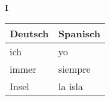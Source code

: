 \begin{flushright}\begin{Huge}\textbf{I}\end{Huge}\end{flushright}

\begin{longtable}{p{} p{}} 
\textbf{Deutsch}     & \textbf{Spanisch}                                       \\ \hline
\hline
\endhead %
ich & yo \\
immer & siempre \\
Insel & la isla \\
\end{longtable}
